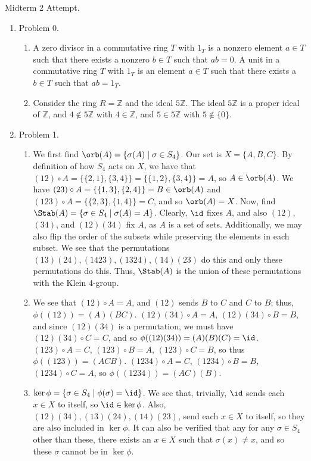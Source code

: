 

\begin{center}
	Midterm 2 Attempt. 
\end{center}

\begin{enumerate}
	\item Problem 0. 
	\begin{enumerate}
		\item A zero divisor in a commutative ring $T$ with $1_T$ is a nonzero element $a \in T$ such that there exists a nonzero $b \in T$ such that $ab = 0$. A unit in a commutative ring $T$ with $1_T$ is an element $a \in T$ such that there exists a $b \in T$ such that $ab = 1_T$. 
		\item Consider the ring $R = \mathbb{Z}$ and the ideal $5\mathbb{Z}$. The ideal $5\mathbb{Z}$ is a proper ideal of $\mathbb{Z}$, and $4 \notin 5\mathbb{Z}$ with $4 \in \mathbb{Z}$, and $5 \in 5\mathbb{Z}$ with $5 \notin \{0\}$. 
	\end{enumerate}
	\item Problem 1. 
	\begin{enumerate}
		\item We first find $\orb(A) = \{\sigma(A) \mid \sigma \in S_4\}$. Our set is $X = \{A,B,C\}$. By definition of how $S_4$ acts on $X$, we have that $(12) \circ A = \{\{2,1\}, \{3,4\}\} = \{\{1,2\}, \{3,4\}\} = A$, so $A \in \orb(A)$. We have $(23) \circ A = \{\{1,3\}, \{2,4\}\} = B \in \orb(A)$ and $(123) \circ A = \{\{2,3\}, \{1,4\}\} = C$, and so $\orb(A) = X$. Now, find $\Stab(A) = \{\sigma \in S_4 \mid \sigma(A) = A\}$. Clearly, $\id$ fixes $A$, and also $(12)$, $(34)$, and $(12)(34)$ fix $A$, as $A$ is a set of sets. Additionally, we may also flip the order of the subsets while preserving the elements in each subset. We see that the permutations $(13)(24), (1423), (1324), (14)(23)$ do this and only these permutations do this. Thus, $\Stab(A)$ is the union of these permutations with the Klein 4-group. 
		\item We see that $(12) \circ A = A$, and $(12)$ sends $B$ to $C$ and $C$ to $B$; thus, $\phi((12)) = (A)(BC)$. $(12)(34) \circ A = A$, $(12)(34) \circ B = B$, and since $(12)(34)$ is a permutation, we must have $(12)(34) \circ C = C$, and so $\phi((12)(34)) = (A)(B)(C) = \id$. $(123) \circ A = C$, $(123) \circ B = A$, $(123) \circ C = B$, so thus $\phi((123)) = (ACB)$. $(1234) \circ A = C$, $(1234) \circ B = B$, $(1234) \circ C = A$, so $\phi((1234)) = (AC)(B)$. 
	\item $\ker\phi = \{\sigma \in S_4 \mid \phi(\sigma) = \id\}$. We see that, trivially, $\id$ sends each $x \in X$ to itself, so $\id \in \ker\phi$. Also, $(12)(34), (13)(24), (14)(23)$, send each $x \in X$ to itself, so they are also included in $\ker\phi$. It can also be verified that any for any $\sigma \in S_4$ other than these, there exists an $x \in X$ such that $\sigma(x) \neq x$, and so these $\sigma$ cannot be in $\ker\phi$. 

\end{enumerate}
\end{enumerate}
